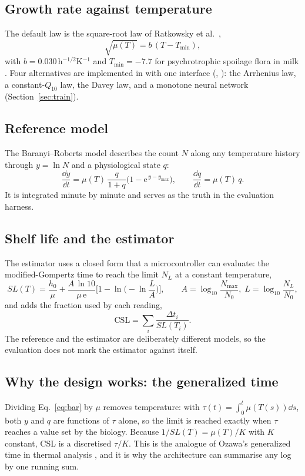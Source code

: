 \subsection{Growth rate against temperature}
The default law is the square-root law of Ratkowsky et al.\ \cite{ratkowsky1982},
\begin{equation}\label{eq:sqrt}
\sqrt{\mu(T)}=b\,(T-T_{\min}),
\end{equation}
with $b=0.030$\,h$^{-1/2}$K$^{-1}$ and $T_{\min}=-7.7$\degC{} for psychrotrophic spoilage flora in milk \cite{neumeyer1995}. Four alternatives are implemented in  with one interface (, ): the Arrhenius law, a constant-$Q_{10}$ law, the Davey law, and a monotone neural network (Section~\ref{sec:train}).

\subsection{Reference model}
The Baranyi--Roberts model \cite{baranyi1994} describes the count $N$ along any temperature history through $y=\ln N$ and a physiological state $q$:
\begin{equation}\label{eq:bar}
\frac{\dd y}{\dd t}=\mu(T)\,\frac{q}{1+q}\big(1-\mathrm e^{\,y-y_{\max}}\big),\qquad\frac{\dd q}{\dd t}=\mu(T)\,q .
\end{equation}
It is integrated minute by minute and serves as the truth in the evaluation harness.

\subsection{Shelf life and the estimator}
The estimator uses a closed form that a microcontroller can evaluate: the modified-Gompertz time to reach the limit $N_L$ at a constant temperature,
\begin{equation}\label{eq:sl}
SL(T)=\frac{h_0}{\mu}+\frac{A\,\ln10}{\mu\,\mathrm e}\Big[1-\ln\!\Big(-\ln\frac{L}{A}\Big)\Big],\qquad A=\log_{10}\frac{N_{\max}}{N_0},\; L=\log_{10}\frac{N_L}{N_0},
\end{equation}
and adds the fraction used by each reading,
\begin{equation}\label{eq:csl}
\mathrm{CSL}=\sum_i\frac{\Delta t_i}{SL(T_i)} .
\end{equation}
The reference and the estimator are deliberately different models, so the evaluation does not mark the estimator against itself.

\subsection{Why the design works: the generalized time}
Dividing Eq.~\eqref{eq:bar} by $\mu$ removes temperature: with $\tau(t)=\int_0^t\mu(T(s))\dd s$, both $y$ and $q$ are functions of $\tau$ alone, so the limit is reached exactly when $\tau$ reaches a value set by the biology. Because $1/SL(T)=\mu(T)/K$ with $K$ constant, CSL is a discretised $\tau/K$. This is the analogue of Ozawa's generalized time in thermal analysis \cite{ozawa1986,malek2013}, and it is why the architecture can summarise any log by one running sum.

